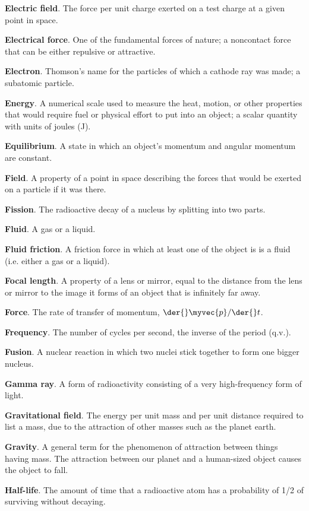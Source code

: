 \textbf{Electric field}. The force per unit charge exerted on a test charge at a given point in space. 

\textbf{Electrical force}. One of the fundamental forces of nature; a noncontact force that can be either
repulsive or attractive. 

\textbf{Electron}. Thomson's name for the particles of which a cathode ray was made; a subatomic particle. 

\textbf{Energy}. A numerical scale used to measure the heat, motion, or other properties that would require
fuel or
physical effort to put into an object; a scalar quantity with units of joules (J).

\textbf{Equilibrium}. A state in which an object's momentum and angular momentum are constant. 

\textbf{Field}. A property of a point in space describing the forces that would be exerted on a particle if it
was there. 

\textbf{Fission}. The radioactive decay of a nucleus by splitting into two parts. 

\textbf{Fluid}. A gas or a liquid. 

\textbf{Fluid friction}. A friction force in which at least one of the object is is a fluid (i.e. either a gas
or a
liquid). 

\textbf{Focal length}. A property of a lens or mirror, equal to the distance from the lens or mirror to the
image it forms of an object that is infinitely far away. 

\textbf{Force}. The rate of transfer of momentum, $\der{}\myvec{p}/\der{}t$.

\textbf{Frequency}. The number of cycles per second, the inverse of the period (q.v.).

\textbf{Fusion}. A nuclear reaction in which two nuclei stick together to form one bigger nucleus. 

\textbf{Gamma ray}. A form of radioactivity consisting of a very high-frequency form of light. 

\textbf{Gravitational field}. The energy per unit mass and per unit distance required to list a mass, due
to the attraction of other masses such as the planet earth. 

\textbf{Gravity}. A general term for the phenomenon of attraction between things having mass. The attraction
between our
planet and a human-sized object causes the object to fall. 

\textbf{Half-life}. The amount of time that a radioactive atom has a probability of 1/2 of surviving without
decaying.

